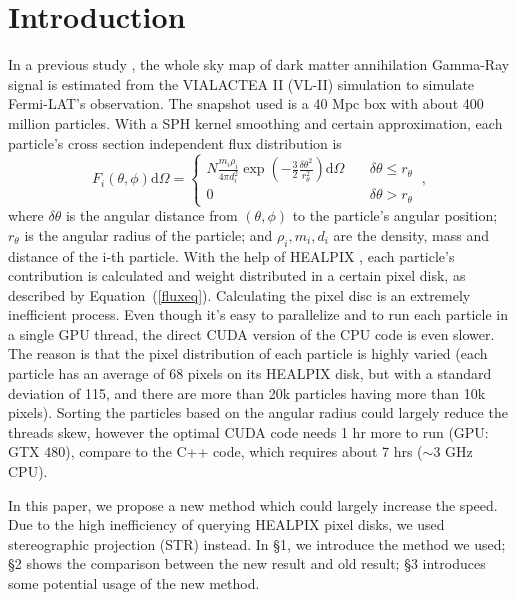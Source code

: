 \section*{Introduction}
In a previous study \citet{Kuhlen:2008kr}, the whole sky map of dark matter annihilation Gamma-Ray signal is estimated from the VIALACTEA II (VL-II) simulation to simulate Fermi-LAT's observation. The snapshot used is a 40 Mpc box with about 400 million particles. With a SPH kernel smoothing and certain approximation, each particle's cross section independent flux distribution is
\begin{equation}\label{fluxeq}
	F_i(\theta,\phi)\mathrm{d}\Omega = 
	\left\{\begin{aligned}
		N\frac{m_i\rho_i}{4\pi d_i^2} \exp\left(-\frac{3}2\frac{\delta\theta^2}{r_\theta^2}\right)\mathrm{d}\Omega  &\  & \delta\theta \le r_\theta \\
		0	&\   & \delta\theta > r_\theta\
	\end{aligned}\right. ,
\end{equation}
where $\delta\theta$ is the angular distance from $(\theta, \phi)$ to the particle's angular position; $r_\theta$ is the angular radius of the particle; and $\rho_i, m_i, d_i$ are the density, mass and distance of the i-th particle. With the help of HEALPIX \citep{Gorski:2005ku}, each particle's contribution is calculated and weight distributed in a certain pixel disk, as described by Equation~(\ref{fluxeq}). Calculating the pixel disc is an extremely inefficient process. Even though it's easy to parallelize and to run each particle in a single GPU thread, the direct CUDA version of the CPU code is even slower. The reason is that the pixel distribution of each particle is highly varied (each particle has an average of 68 pixels on its HEALPIX disk, but with a standard deviation of 115, and there are more than 20k particles having more than 10k pixels). Sorting the particles based on the angular radius could largely reduce the threads skew, however the optimal CUDA code needs 1 hr more to run (GPU: GTX 480), compare to the C++ code, which requires about 7 hrs ($\sim$3 GHz CPU). 

In this paper, we propose a new method which could largely increase the speed. Due to the high inefficiency of querying HEALPIX pixel disks, we used stereographic projection (STR) instead. In \S 1, we introduce the method we used; \S 2 shows the comparison between the new result and old result; \S 3 introduces some potential usage of the new method.


